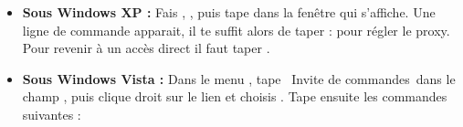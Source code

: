 \begin{itemize}

\item \textbf{Sous Windows XP :} Fais , , puis
tape  dans la fen\^etre qui s'affiche. Une ligne de commande apparait,
il te suffit alors de taper :  pour r\'egler
le proxy. Pour revenir \`a un acc\`es direct il faut taper .

\item \textbf{Sous Windows Vista :}
Dans le menu , tape \guillemotleft~Invite de commandes~\guillemotright dans le champ , puis clique droit sur le lien
et choisis . Tape ensuite les commandes suivantes :

\noindent {}



\end{itemize}
